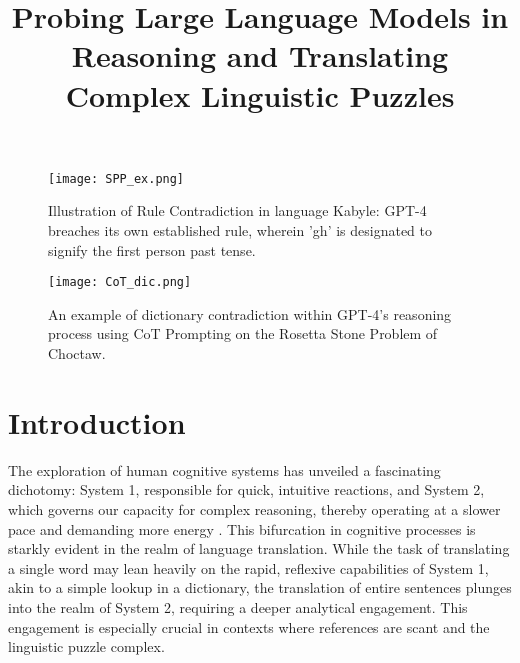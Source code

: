 \documentclass[10pt, a4paper]{article}
\title{\textbf{Probing Large Language Models in Reasoning and Translating Complex Linguistic Puzzles}}
\begin{document}
\maketitleabstract

\begin{figure*}[htp]
    \centering
    \texttt{[image: SPP\_ex.png]}
    \caption{Illustration of Rule Contradiction in language Kabyle: GPT-4 breaches its own established rule, wherein 'gh' is designated to signify the first person past tense.}

    

    \label{spp_rule}
\end{figure*}

\begin{figure*}[htp]
    \centering
    \texttt{[image: CoT\_dic.png]}
    \caption{An example of dictionary contradiction within GPT-4's reasoning process using CoT Prompting on the Rosetta Stone Problem of Choctaw. }

    \label{cot_dic}
\end{figure*}


\section{Introduction}
The exploration of human cognitive systems has unveiled a fascinating dichotomy: System 1, responsible for quick, intuitive reactions, and System 2, which governs our capacity for complex reasoning, thereby operating at a slower pace and demanding more energy \citep{tfs}. This bifurcation in cognitive processes is starkly evident in the realm of language translation. While the task of translating a single word may lean heavily on the rapid, reflexive capabilities of System 1, akin to a simple lookup in a dictionary, the translation of entire sentences plunges into the realm of System 2, requiring a deeper analytical engagement. This engagement is especially crucial in contexts where references are scant and the linguistic puzzle complex.
\end{document}

